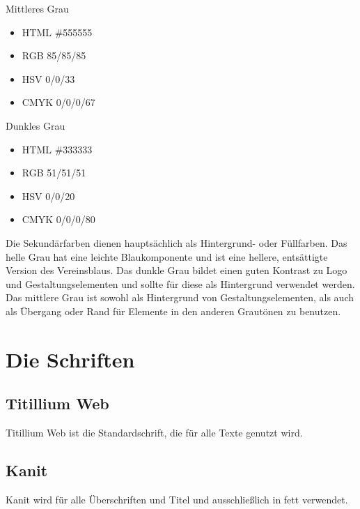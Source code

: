 \documentclass{article}
\begin{document}
\begin{samepage}
\cfield[SECMedium]
Mittleres Grau
\begin{itemize}
\item HTML \#555555
\item RGB 85/85/85
\item HSV 0/0/33
\item CMYK 0/0/0/67
\end{itemize}
\end{samepage}

\begin{samepage}
\cfield[SECDark]
Dunkles Grau
\begin{itemize}
\item HTML \#333333
\item RGB 51/51/51
\item HSV 0/0/20
\item CMYK 0/0/0/80
\end{itemize}
\end{samepage}

Die Sekundärfarben dienen hauptsächlich als Hintergrund- oder Füllfarben.
Das helle Grau hat eine leichte Blaukomponente und ist eine hellere, entsättigte Version des Vereinsblaus.
Das dunkle Grau bildet einen guten Kontrast zu Logo und Gestaltungselementen und sollte für diese als Hintergrund verwendet werden.
Das mittlere Grau ist sowohl als Hintergrund von Gestaltungselementen, als auch als Übergang oder Rand für Elemente in den anderen Grautönen zu benutzen.

\cleardoublepage
\section{Die Schriften}

\subsection{Titillium Web}
\begin{samepage}
Titillium Web ist die Standardschrift, die für alle Texte genutzt wird.

\end{samepage}

\subsection{Kanit}
\begin{samepage}
Kanit wird für alle Überschriften und Titel und ausschließlich in fett verwendet.

\end{samepage}
\end{document}
